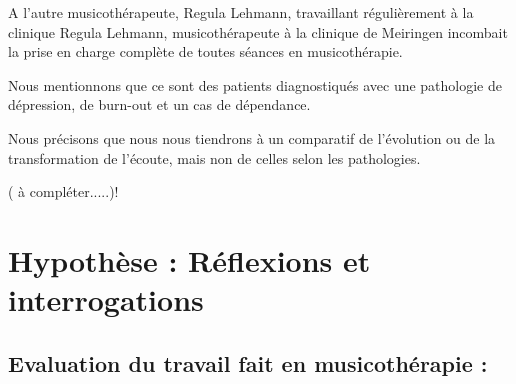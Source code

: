 \documentclass[12pt,french]{report}
\makeatletter
\let\SF@@footnote\footnote
\def\footnote{\ifx\protect\@typeset@protect
    \expandafter\SF@@footnote
  \else
    \expandafter\SF@gobble@opt
  \fi
}
\edef\SF@gobble@opt{\noexpand\protect
  \expandafter\noexpand\csname SF@gobble@opt \endcsname}
\makeatother
\begin{document}
A l'autre musicothérapeute, Regula Lehmann, travaillant régulièrement
à la clinique \footnote{Regula Lehmann, musicothérapeute à la clinique de Meiringen}
incombait la prise en charge complète de toutes séances en musicothérapie.

Nous mentionnons que ce sont des patients diagnostiqués avec une pathologie
de dépression, de burn-out et un cas de dépendance. 

Nous précisons que nous nous tiendrons à un comparatif de l'évolution
ou de la transformation de l'écoute, mais non de celles selon les
pathologies.

( à compléter.....)!


\chapter{Hypothèse : Réflexions et interrogations}

\section{Evaluation du travail fait en musicothérapie : }
\end{document}

